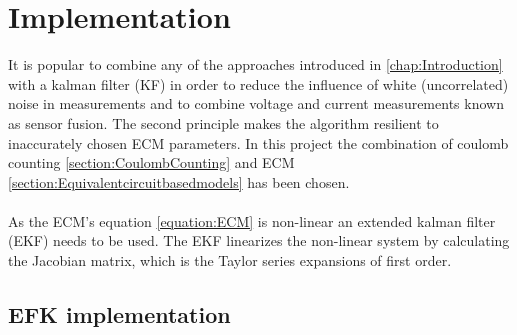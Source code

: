 
\chapter{Implementation}
\label{chap:Implementation}


It is popular to combine %
any of the approaches introduced in \ref{chap:Introduction} with a kalman filter (KF) in order to reduce the influence of white (uncorrelated) noise in measurements and to combine voltage and current measurements known as sensor fusion. The second principle makes the algorithm resilient to inaccurately chosen ECM parameters. In this project the combination of coulomb counting \ref{section:CoulombCounting} and ECM \ref{section:Equivalentcircuitbasedmodels} has been chosen. \\ %
\\
As the  ECM's equation \ref{equation:ECM}  is non-linear an extended kalman filter (EKF) needs to be used. The EKF linearizes the non-linear system by calculating the Jacobian matrix, which is the Taylor series expansions of first order.  %
\\

\section{EFK implementation}
\label{Fork}

